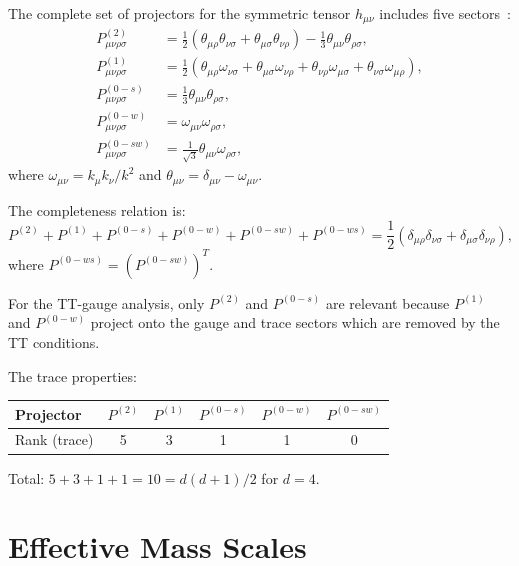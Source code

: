 \documentclass[11pt,a4paper]{article}
\theoremstyle{plain}
\theoremstyle{definition}
\begin{document}
The complete set of projectors for the symmetric tensor
$h_{\mu\nu}$ includes five sectors~\cite{vN73}:
\begin{align}
  P^{(2)}_{\mu\nu\rho\sigma} &= \frac{1}{2}
  (\theta_{\mu\rho}\theta_{\nu\sigma} + \theta_{\mu\sigma}\theta_{\nu\rho})
  - \frac{1}{3}\theta_{\mu\nu}\theta_{\rho\sigma},\\
  P^{(1)}_{\mu\nu\rho\sigma} &= \frac{1}{2}
  (\theta_{\mu\rho}\omega_{\nu\sigma} + \theta_{\mu\sigma}\omega_{\nu\rho}
  + \theta_{\nu\rho}\omega_{\mu\sigma} + \theta_{\nu\sigma}\omega_{\mu\rho}),\\
  P^{(0-s)}_{\mu\nu\rho\sigma} &= \frac{1}{3}
  \theta_{\mu\nu}\theta_{\rho\sigma},\\
  P^{(0-w)}_{\mu\nu\rho\sigma} &= \omega_{\mu\nu}\omega_{\rho\sigma},\\
  P^{(0-sw)}_{\mu\nu\rho\sigma} &= \frac{1}{\sqrt{3}}
  \theta_{\mu\nu}\omega_{\rho\sigma},
\end{align}
where $\omega_{\mu\nu} = k_\mu k_\nu/k^2$ and
$\theta_{\mu\nu} = \delta_{\mu\nu} - \omega_{\mu\nu}$.

The completeness relation is:
\begin{equation}
  P^{(2)} + P^{(1)} + P^{(0-s)} + P^{(0-w)}
  + P^{(0-sw)} + P^{(0-ws)} = \frac{1}{2}
  (\delta_{\mu\rho}\delta_{\nu\sigma} + \delta_{\mu\sigma}\delta_{\nu\rho}),
\end{equation}
where $P^{(0-ws)} = (P^{(0-sw)})^T$.

For the TT-gauge analysis, only $P^{(2)}$ and $P^{(0-s)}$ are relevant
because $P^{(1)}$ and $P^{(0-w)}$ project onto the gauge and trace
sectors which are removed by the TT conditions.

The trace properties:
\begin{center}
\begin{tabular}{lccccc}
\toprule
Projector & $P^{(2)}$ & $P^{(1)}$ & $P^{(0-s)}$ & $P^{(0-w)}$ & $P^{(0-sw)}$ \\
\midrule
Rank (trace) & 5 & 3 & 1 & 1 & 0 \\
\bottomrule
\end{tabular}
\end{center}

Total: $5 + 3 + 1 + 1 = 10 = d(d+1)/2$ for $d=4$.

\section{Effective Mass Scales}\label{app:masses}
\end{document}
